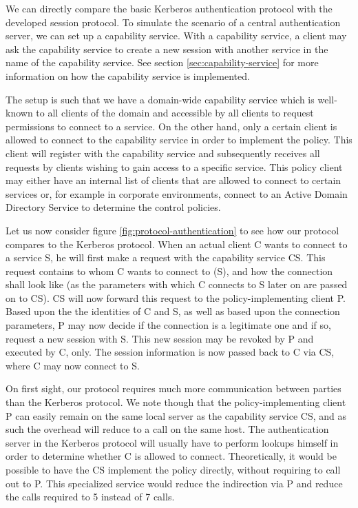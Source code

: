 We can directly compare the basic Kerberos authentication protocol with the developed session protocol.
To simulate the scenario of a central authentication server, we can set up a capability service.
With a capability service, a client may ask the capability service to create a new session with another service in the name of the capability service.
See section \ref{sec:capability-service} for more information on how the capability service is implemented.

The setup is such that we have a domain-wide capability service which is well-known to all clients of the domain and accessible by all clients to request permissions to connect to a service.
On the other hand, only a certain client is allowed to connect to the capability service in order to implement the policy.
This client will register with the capability service and subsequently receives all requests by clients wishing to gain access to a specific service.
This policy client may either have an internal list of clients that are allowed to connect to certain services or, for example in corporate environments, connect to an Active Domain Directory Service to determine the control policies.

Let us now consider figure \ref{fig:protocol-authentication} to see how our protocol compares to the Kerberos protocol.
When an actual client C wants to connect to a service S, he will first make a request with the capability service CS.
This request contains to whom C wants to connect to (S), and how the connection shall look like (as the parameters with which C connects to S later on are passed on to CS).
CS will now forward this request to the policy-implementing client P.
Based upon the the identities of C and S, as well as based upon the connection parameters, P may now decide if the connection is a legitimate one and if so, request a new session with S.
This new session may be revoked by P and executed by C, only.
The session information is now passed back to C via CS, where C may now connect to S.

On first sight, our protocol requires much more communication between parties than the Kerberos protocol.
We note though that the policy-implementing client P can easily remain on the same local server as the capability service CS, and as such the overhead will reduce to a call on the same host.
The authentication server in the Kerberos protocol will usually have to perform lookups himself in order to determine whether C is allowed to connect.
Theoretically, it would be possible to have the CS implement the policy directly, without requiring to call out to P.
This specialized service would reduce the indirection via P and reduce the calls required to 5 instead of 7 calls.

